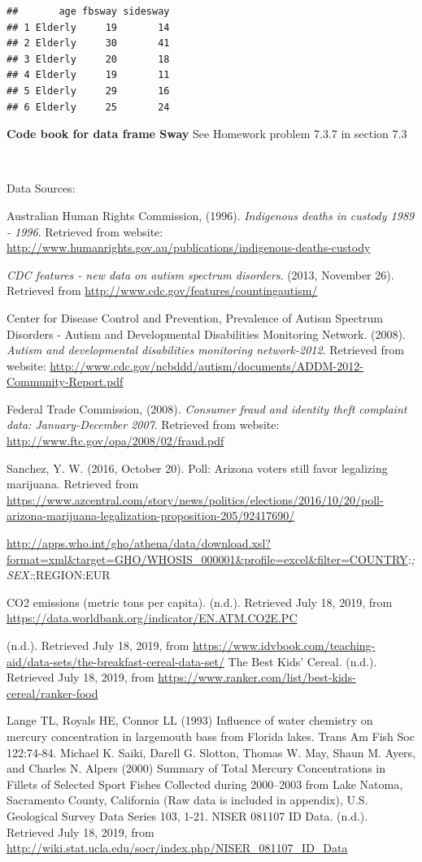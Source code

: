 \documentclass[
]{book}
\begin{document}
\begin{verbatim}
##       age fbsway sidesway
## 1 Elderly     19       14
## 2 Elderly     30       41
## 3 Elderly     20       18
## 4 Elderly     19       11
## 5 Elderly     29       16
## 6 Elderly     25       24
\end{verbatim}

\textbf{Code book for data frame Sway} See Homework problem 7.3.7 in section 7.3

\textbf{\\
}

Data Sources:

Australian Human Rights Commission, (1996). \emph{Indigenous deaths in
custody 1989 - 1996}. Retrieved from website:
\url{http://www.humanrights.gov.au/publications/indigenous-deaths-custody}

\emph{CDC features - new data on autism spectrum disorders}. (2013, November
26). Retrieved from \url{http://www.cdc.gov/features/countingautism/}

Center for Disease Control and Prevention, Prevalence of Autism Spectrum
Disorders - Autism and Developmental Disabilities Monitoring Network.
(2008). \emph{Autism and developmental disabilities monitoring network-2012}.
Retrieved from website:
\url{http://www.cdc.gov/ncbddd/autism/documents/ADDM-2012-Community-Report.pdf}

Federal Trade Commission, (2008). \emph{Consumer fraud and identity theft
complaint data: January-December 2007}. Retrieved from website:
\url{http://www.ftc.gov/opa/2008/02/fraud.pdf}

Sanchez, Y. W. (2016, October 20). Poll: Arizona voters still favor legalizing marijuana. Retrieved from \url{https://www.azcentral.com/story/news/politics/elections/2016/10/20/poll-arizona-marijuana-legalization-proposition-205/92417690/}

\url{http://apps.who.int/gho/athena/data/download.xsl?format=xml\&target=GHO/WHOSIS_000001\&profile=excel\&filter=COUNTRY}:\emph{;SEX:};REGION:EUR

CO2 emissions (metric tons per capita). (n.d.). Retrieved July 18, 2019, from \url{https://data.worldbank.org/indicator/EN.ATM.CO2E.PC}

(n.d.). Retrieved July 18, 2019, from \url{https://www.idvbook.com/teaching-aid/data-sets/the-breakfast-cereal-data-set/}
The Best Kids' Cereal. (n.d.). Retrieved July 18, 2019, from \url{https://www.ranker.com/list/best-kids-cereal/ranker-food}

Lange TL, Royals HE, Connor LL (1993) Influence of water chemistry on mercury concentration in largemouth bass from Florida lakes. Trans Am Fish Soc 122:74-84.
Michael K. Saiki, Darell G. Slotton, Thomas W. May, Shaun M. Ayers, and Charles N. Alpers (2000) Summary of Total Mercury Concentrations in Fillets of Selected Sport Fishes Collected during 2000--2003 from Lake Natoma, Sacramento County, California (Raw data is included in appendix), U.S. Geological Survey Data Series 103, 1-21.
NISER 081107 ID Data. (n.d.). Retrieved July 18, 2019, from \url{http://wiki.stat.ucla.edu/socr/index.php/NISER_081107_ID_Data}
\end{document}
